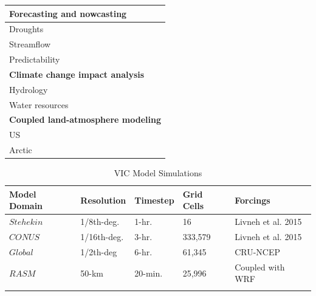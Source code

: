 \documentclass[gmd, manuscript]{copernicus}
\begin{document}
\begin{table}[]
{\begin{tabular}{ll}
    \multicolumn{2}{l}{\textbf{Forecasting and nowcasting}}                                                                                                         \\ \hline
    \multicolumn{1}{l|}{Droughts}                & \citet{Shukla_2011}  \\ \hline
    \multicolumn{1}{l|}{Streamflow}              & \citet{Hamlet_1999,Li_2009,Wood_2002}  \\ \hline
    \multicolumn{1}{l|}{Predictability}          & \citet{Gebregiorgis_2011,Maurer_2003}  \\ \hline
    \multicolumn{2}{l}{\textbf{Climate change impact analysis}}                                                                                                     \\ \hline
    \multicolumn{1}{l|}{Hydrology}               & \citet{Barnett_2005,Beyene_2010,Nijssen_2001b}  \\ \hline
    \multicolumn{1}{l|}{Water resources}         & \citet{Christensen_2007,Christensen_2004,Das_2011,Hamlet_1999}  \\ \hline
    \multicolumn{2}{l}{\textbf{Coupled land-atmosphere modeling}}                                                                                                     \\ \hline
    \multicolumn{1}{l|}{US}                      & \citet{Zhu_2009}                                           \\ \hline
    \multicolumn{1}{l|}{Arctic}                  & \citet{Hamman_2016a, Hamman_2016b} \\ \hline
  \end{tabular}
  }
\end{table}

\clearpage
\begin{table}
  \caption{VIC Model Simulations}
  \centering
  \begin{tabular}{l l l l l}
    \hline
    Model Domain  & Resolution  & Timestep  & Grid Cells  & Forcings  \\
    \hline
    $Stehekin$  & 1/8th-deg.  & 1-hr. & 16 & Livneh et al. 2015   \\
    $CONUS$  & 1/16th-deg.  & 3-hr. & 333,579 & Livneh et al. 2015   \\
    $Global$  & 1/2th-deg & 6-hr.  & 61,345 & CRU-NCEP   \\
    $RASM$  & 50-km  & 20-min. & 25,996 & Coupled with WRF  \\
    \hline
    \label{table:model_sims}
  \end{tabular}
\end{table}
\end{document}
